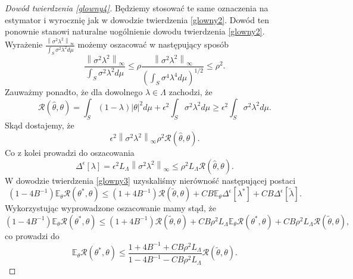 \documentclass{article}
\newcommand{\norm}[1]{\left\lVert#1\right\rVert}
\begin{document}
\begin{proof}[Dowód twierdzenia \ref{glowny4}]
Będziemy stosować te same oznaczenia na estymator i wyrocznię jak w dowodzie twierdzenia \ref{glowny2}. Dowód ten ponownie stanowi naturalne uogólnienie dowodu twierdzenia \ref{glowny2}.\\
Wyrażenie $\frac{\norm{\sigma^2\lambda^2}_{\infty}}{\int_S\sigma^2\lambda^2 d\mu}$ możemy oszacować w następujący sposób
\begin{displaymath}
\frac{\norm{\sigma^2\lambda^2}_{\infty}}{\int_S\sigma^2\lambda^2 d\mu}\leq \rho \frac{\norm{\sigma^2\lambda^2}_{\infty}}{\left(\int_S\sigma^4\lambda^4 d\mu\right)^{1/2}}\leq \rho^2.
\end{displaymath}
Zauważmy ponadto, że dla dowolnego $\lambda\in \Lambda$ zachodzi, że
\begin{displaymath}
\mathcal{R}(\hat{\theta},\theta)=\int_S(1-\lambda)|\theta |^2 d\mu+\epsilon^2\int_S\sigma^2\lambda^2 d\mu\geq \epsilon^2\int_S\sigma^2\lambda^2 d\mu.
\end{displaymath}
Skąd dostajemy, że
\begin{displaymath}
\epsilon^2\norm{\sigma^2\lambda^2}_{\infty} \rho^2\mathcal{R}(\hat{\theta},\theta).
\end{displaymath}
Co z kolei prowadzi do oszacowania
\begin{displaymath}
\Delta^{\epsilon}[\lambda]=\epsilon^2L_{\Lambda}\norm{\sigma^2\lambda^2}_{\infty}\leq \rho^2L_{\Lambda}\mathcal{R}(\hat{\theta},\theta).
\end{displaymath}
W dowodzie twierdzenia \ref{glowny3} uzyskaliśmy nierówność następującej postaci
\begin{displaymath}
(1-4B^{-1})\mathbb{E}_{\theta}\mathcal{R}(\theta^*,\theta)\leq (1+4B^{-1})\mathcal{R}(\tilde{\theta},\theta)+CB\mathbb{E}_{\theta}\Delta^{\epsilon}[\lambda^*]+CB\Delta^{\epsilon}[\tilde{\lambda}].
\end{displaymath}
Wykorzystując wyprowadzone oszacowanie mamy stąd, że
\begin{displaymath}
(1-4B^{-1})\mathbb{E}_{\theta}\mathcal{R}(\theta^*,\theta)\leq (1+4B^{-1})\mathcal{R}(\tilde{\theta},\theta)+CB\rho^2L_{\Lambda}\mathbb{E}_{\theta}\mathcal{R}(\theta^*,\theta)+CB\rho^2L_{\Lambda}\mathcal{R}(\tilde{\theta},\theta),
\end{displaymath}
co prowadzi do
\begin{displaymath}
\mathbb{E}_{\theta}\mathcal{R}(\theta^*,\theta)\leq\frac{1+4B^{-1}+CB\rho^2L_{\Lambda}}{1-4B^{-1}-CB\rho^2L_{\Lambda}}\mathcal{R}(\tilde{\theta},\theta).

\end{displaymath}
\end{proof}
\end{document}
